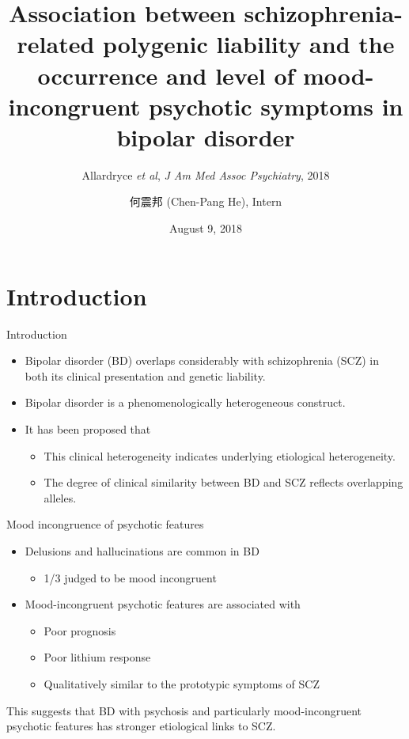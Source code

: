 \documentclass{beamer}
\title[(Allardyce \textit{et al}, 2018)]{Association between schizophrenia-related polygenic liability and the occurrence and level of mood-incongruent psychotic symptoms in bipolar disorder}
\subtitle{Allardryce \textit{et al}, \textit{J Am Med Assoc Psychiatry}, 2018}
\author[Chen-Pang He]{何震邦 (Chen-Pang He), Intern}
\date{August 9, 2018}
\institute[CGH]{Cathay General Hospital}
\begin{document}
\maketitle

\section{Introduction}
\begin{frame}{Introduction}
    \begin{itemize}
        \item Bipolar disorder (BD) overlaps considerably with schizophrenia
              (SCZ) in both its clinical presentation and genetic liability.
        \item Bipolar disorder is a phenomenologically heterogeneous construct.
        \item It has been proposed that
            \begin{itemize}
                \item This clinical heterogeneity indicates underlying etiological heterogeneity.
                \item The degree of clinical similarity between BD and SCZ reflects overlapping alleles.
            \end{itemize}
    \end{itemize}
\end{frame}

\begin{frame}{Mood incongruence of psychotic features}
    \begin{itemize}
        \item Delusions and hallucinations are common in BD
            \begin{itemize}
                \item 1/3 judged to be mood incongruent
            \end{itemize}
        \item Mood-incongruent psychotic features are associated with
            \begin{itemize}
                \item Poor prognosis
                \item Poor lithium response
                \item Qualitatively similar to the prototypic symptoms of SCZ
            \end{itemize}
    \end{itemize}

    This suggests that BD with psychosis and particularly mood-incongruent
    psychotic features has stronger etiological links to SCZ.
\end{frame}
\end{document}
